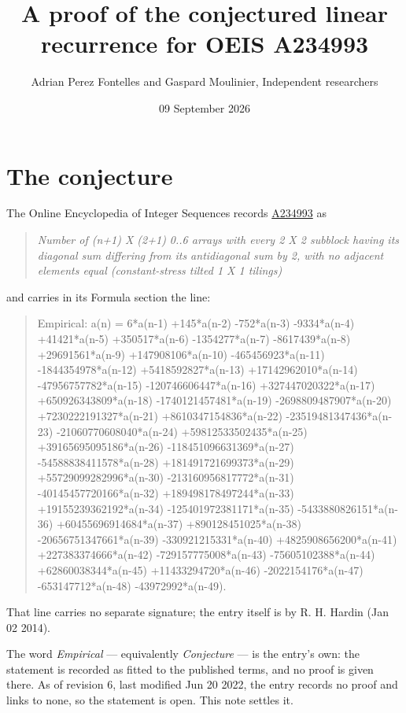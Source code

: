 \documentclass[11pt]{article}
\title{A proof of the conjectured linear recurrence for OEIS A234993}
\author{Adrian Perez Fontelles and Gaspard Moulinier, Independent researchers}
\date{09 September 2026}
\theoremstyle{definition}
\begin{document}
\maketitle
\section{The conjecture}

The Online Encyclopedia of Integer Sequences records \href{https://oeis.org/A234993}{A234993} as

\begin{quote}\itshape Number of (n+1) X (2+1) 0..6 arrays with every 2 X 2 subblock having its diagonal sum differing from its antidiagonal sum by 2, with no adjacent elements equal (constant-stress tilted 1 X 1 tilings)\end{quote}

and carries in its Formula section the line:

\begin{quote}\ttfamily Empirical: a(n) = 6*a(n-1) +145*a(n-2) -752*a(n-3) -9334*a(n-4) +41421*a(n-5) +350517*a(n-6) -1354277*a(n-7) -8617439*a(n-8) +29691561*a(n-9) +147908106*a(n-10) -465456923*a(n-11) -1844354978*a(n-12) +5418592827*a(n-13) +17142962010*a(n-14) -47956757782*a(n-15) -120746606447*a(n-16) +327447020322*a(n-17) +650926343809*a(n-18) -1740121457481*a(n-19) -2698809487907*a(n-20) +7230222191327*a(n-21) +8610347154836*a(n-22) -23519481347436*a(n-23) -21060770608040*a(n-24) +59812533502435*a(n-25) +39165695095186*a(n-26) -118451096631369*a(n-27) -54588838411578*a(n-28) +181491721699373*a(n-29) +55729099282996*a(n-30) -213160956817772*a(n-31) -40145457720166*a(n-32) +189498178497244*a(n-33) +19155239362192*a(n-34) -125401972381171*a(n-35) -5433880826151*a(n-36) +60455696914684*a(n-37) +890128451025*a(n-38) -20656751347661*a(n-39) -330921215331*a(n-40) +4825908656200*a(n-41) +227383374666*a(n-42) -729157775008*a(n-43) -75605102388*a(n-44) +62860038344*a(n-45) +11433294720*a(n-46) -2022154176*a(n-47) -653147712*a(n-48) -43972992*a(n-49).\end{quote}

That line carries no separate signature; the entry itself is by R. H. Hardin (Jan 02 2014).

The word {\itshape Empirical} --- equivalently {\itshape Conjecture} --- is the entry's own: the statement is recorded as fitted to the published terms, and no proof is given there. As of revision 6, last modified Jun 20 2022, the entry records no proof and links to none, so the statement is open. This note settles it.
\end{document}
